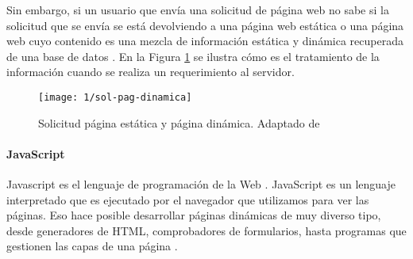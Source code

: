 Sin embargo, si un usuario  que envía una solicitud de página web no sabe si la solicitud que se envía se está devolviendo a una página web estática o una página web cuyo contenido es una mezcla de información estática y dinámica recuperada de una base de datos \cite{Hoffer2016}.
En la Figura \ref{fig:sol-pag-din} se ilustra cómo es el tratamiento de la información cuando se realiza un requerimiento al servidor.

 \begin{figure} %
 			\begin{center}
	\texttt{[image: 1/sol-pag-dinamica]}
	\caption{Solicitud página estática y página dinámica. Adaptado de \cite{Hoffer2016}}
	\label{fig:sol-pag-din}
			\end{center}
\end{figure}



\paragraph{JavaScript} 

Javascript es el lenguaje de programación de la Web \cite{Flanagan2006}. \gls{JavaScript} es  un lenguaje interpretado que es ejecutado por el navegador que utilizamos para ver las páginas. Eso hace posible  desarrollar páginas dinámicas de muy diverso tipo, desde generadores de HTML, comprobadores de formularios, hasta programas que gestionen las capas de una página .  

